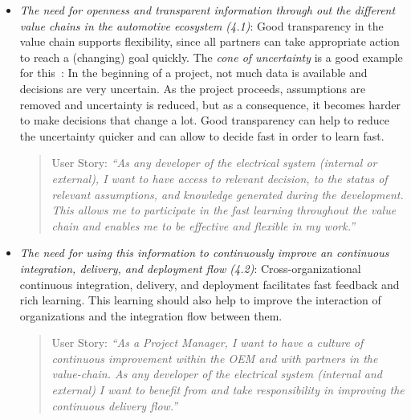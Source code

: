 \begin{itemize}
\begin{itemize}
\item {\em The need for openness and transparent information through out the different value chains in the automotive ecosystem (4.1)}: Good transparency in the value chain supports flexibility, since all partners can take appropriate action to reach a (changing) goal quickly. 
The \emph{cone of uncertainty} is a good example for this~\cite{cone-of-uncertainty,cone-of-uncertainty2}: In the beginning of a project, not much data is available and decisions are very uncertain. 
As the project proceeds, assumptions are removed and uncertainty is reduced, but as  a consequence, it becomes harder to make decisions that change a lot. 
Good transparency can help to reduce the uncertainty quicker and can allow to decide fast in order to learn fast.
\begin{quote}
{User Story:} 
\emph{``As any developer of the electrical system (internal or external), I want to have access to relevant decision, to the status of relevant assumptions, and knowledge generated during the development. 
This allows me to participate in the fast learning throughout the value chain and enables me to be effective and flexible in my work.''}
\end{quote}

\item {\em The need for using this information to continuously improve an continuous integration, delivery, and deployment flow (4.2)}: 
Cross-organizational continuous integration, delivery, and deployment facilitates fast feedback and rich learning.
This learning should also help to improve the interaction of organizations and the integration flow between them.

\begin{quote}
{User Story:} 
\emph{``As a Project Manager, I want to have a culture of continuous improvement within the OEM and with partners in the value-chain. As any developer of the electrical system (internal and external) I want to benefit from and take responsibility in improving the continuous delivery flow.''}
\end{quote}


\end{itemize}
\end{itemize}
